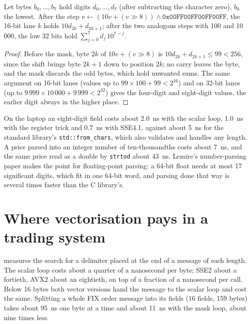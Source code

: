\begin{proposition}\label{prop:ll:vector-instructions-and-data-parallel-code:swar}
Let bytes $b_0,\dots,b_7$ hold digits $d_0,\dots,d_7$ (after subtracting the character zero), $b_0$ the lowest. After the
step $v \leftarrow (10v + (v \gg 8)) \wedge \mathtt{0x00FF00FF00FF00FF}$, the 16-bit lane $k$ holds $10 d_{2k} + d_{2k+1}$;
after the two analogous steps with 100 and 10\,000, the low 32 bits hold $\sum_{j=0}^{7} d_j\, 10^{7-j}$.
\end{proposition}

\begin{proof}
Before the mask, byte $2k$ of $10v + (v \gg 8)$ is $10 d_{2k} + d_{2k+1} \le 99 < 256$, since the shift brings byte $2k+1$
down to position $2k$; no carry leaves the byte, and the mask discards the odd bytes, which hold unwanted sums. The same
argument on 16-bit lanes (values up to $99 \times 100 + 99 < 2^{16}$) and on 32-bit lanes (up to $9\,999 \times 10\,000 +
9\,999 < 2^{32}$) gives the four-digit and eight-digit values, the earlier digit always in the higher place.
\end{proof}

On the laptop an eight-digit field costs about \qty{2.0}{\nano\second} with the scalar loop, \qty{1.0}{\nano\second} with the
register trick and \qty{0.7}{\nano\second} with SSE4.1, against about \qty{5}{\nano\second} for the standard library's
\texttt{std::from\_chars}, which also validates and handles any length. A price parsed into an integer number of
ten-thousandths costs about \qty{7}{\nano\second}, and the same price read as a double by \texttt{strtod} about
\qty{43}{\nano\second}. Lemire's number-parsing paper makes the point for floating-point parsing: a 64-bit float needs at most
17 significant digits, which fit in one 64-bit word, and parsing done that way is several times faster than the C library's.

\section{Where vectorisation pays in a trading system}

 measures the search for a delimiter placed at the end of a
message of each length. The scalar loop costs about a quarter of a nanosecond per byte; SSE2 about a fortieth, AVX2 about an
eightieth, on top of a fraction of a nanosecond per call. Below 16 bytes both vector versions hand the message to the scalar loop
and cost the same. Splitting a whole FIX order message into its fields (16 fields, 159 bytes) takes about
\qty{95}{\nano\second} one byte at a time and about \qty{11}{\nano\second} with the mask loop, about nine times less.

